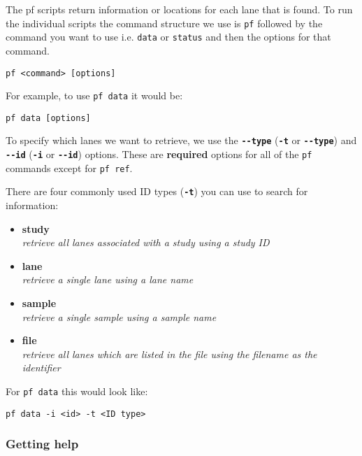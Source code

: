 \documentclass[11pt]{article}
\begin{document}
The pf scripts return information or locations for each lane that is
found. To run the individual scripts the command structure we use is
\texttt{pf} followed by the command you want to use i.e. \texttt{data}
or \texttt{status} and then the options for that command.

\begin{verbatim}
pf <command> [options]
\end{verbatim}

For example, to use \texttt{pf\ data} it would be:

\begin{verbatim}
pf data [options]
\end{verbatim}

To specify which lanes we want to retrieve, we use the
\textbf{\texttt{-\/-type}} (\textbf{\texttt{-t}} or
\textbf{\texttt{-\/-type}}) and \textbf{\texttt{-\/-id}}
(\textbf{\texttt{-i}} or \textbf{\texttt{-\/-id}}) options. These are
\textbf{required} options for all of the \texttt{pf} commands except for
\texttt{pf\ ref}.

There are four commonly used ID types (\textbf{\texttt{-t}}) you can use
to search for information:

\begin{itemize}
\item
  \textbf{study}\\
  \textit{retrieve all lanes associated with a study using a study ID}
\item
  \textbf{lane}\\
  \textit{retrieve a single lane using a lane name}
\item
  \textbf{sample}\\
  \textit{retrieve a single sample using a sample name}
\item
  \textbf{file}\\
  \textit{retrieve all lanes which are listed in the file using the
  filename as the identifier}
\end{itemize}

For \texttt{pf\ data} this would look like:

\begin{verbatim}
pf data -i <id> -t <ID type>
\end{verbatim}

\hypertarget{getting-help}{%
\subsubsection{Getting help}\label{getting-help}}
\end{document}
